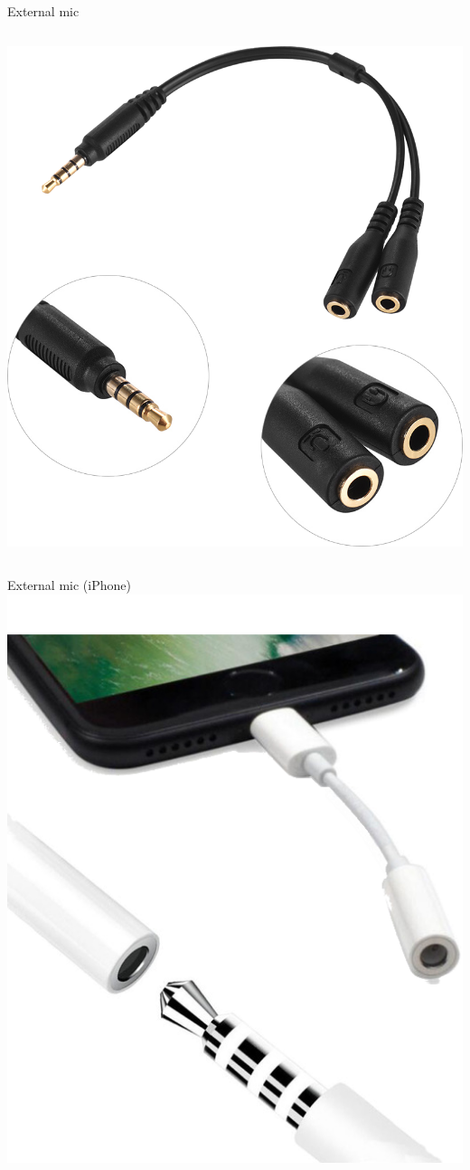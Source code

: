 \documentclass[serif,14pt,color=usenames,dvipsnames]{beamer}
\begin{document}
\begin{frame}{External mic}
\begin{columns}
    \includegraphics[width=\linewidth]{imgs/trrs}
\end{columns}
\end{frame}


\begin{frame}{External mic (iPhone)}
  \centering
  \includegraphics[width=0.4\linewidth]{imgs/35mm}
\end{frame}
\end{document}
